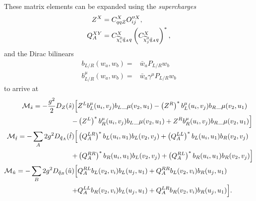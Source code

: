 \documentclass[../main.tex]{subfiles}
\begin{document}
These matrix elements can be expanded using the \textit{supercharges}
\begin{subequations}
	\begin{align}
		Z^X      & = C_{qqZ}^X O_{ij}^{\prime\prime X},                                            \\
		Q_A^{XY} & = C_{\nino[i] \tilde{q}_A q}^{X} \pclosed{C_{\nino[j] \tilde{q}_A q}^{X}}^\ast,
	\end{align}
\end{subequations}
and the Dirac bilinears
\begin{subequations}
	\begin{align}
		b_{L/R}(w_a, w_b) =     & \bar{w}_a P_{L/R} w_b            \\
		b_{L/R}^\mu(w_a, w_b) = & \bar{w}_a \gamma^\mu P_{L/R} w_b
	\end{align}
\end{subequations}
to arrive at
\begin{subequations}
	\begin{align}
		\nonumber
		\mathcal{M}_{\hat{s}} = -\frac{g^2}{2} D_Z(\hat{s}) \Big[           & Z^L b_L^\mu(u_i, v_j){b_L}\_{\mu}(v_2, u_1) - \left(Z^R\right)^\ast b_L^\mu(u_i, v_j){b_R}\_{\mu}(v_2, u_1)         \\
		-                                                          & \left(Z^L\right)^\ast b_{R}^\mu(u_i, v_j){b_L}\_{\mu}(v_2, u_1) + Z^R b_R^\mu(u_i, v_j){b_R}\_{\mu}(v_2, u_1) \Big] \\
		\nonumber
		\mathcal{M}_{\hat{t}} = -\sum_A 2g^2 D_{\tilde{q}_A}(\hat{t}) \Big[ & \left(Q_A^{LR}\right)^\ast b_L(u_i, u_1) b_L(v_2, v_j) +  \left(Q_A^{LL}\right)^\ast b_L(u_i, u_1) b_R(v_2, v_j)       \\
		+                                                          & \left(Q_A^{RR}\right)^\ast b_R(u_i, u_1) b_L(v_2, v_j) + \left(Q_A^{RL}\right)^\ast b_R(u_i, u_1) b_R(v_2, v_j) \Big]  \\
		\nonumber
		\mathcal{M}_{\hat{u}} = -\sum_B 2g^2 D_{\tilde{q}_B}(\hat{u}) \Big[ & Q_A^{RL} b_L(v_2, v_i) b_L(u_j, u_1) + Q_A^{RR} b_L(v_2, v_i) b_R(u_j, u_1)                                      \\
		+                                                          & Q_A^{LL} b_R(v_2, v_i) b_L(u_j, u_1) + Q_A^{LR} b_R(v_2, v_i) b_R(u_j, u_1) \Big].
	\end{align}
\end{subequations}
\end{document}
